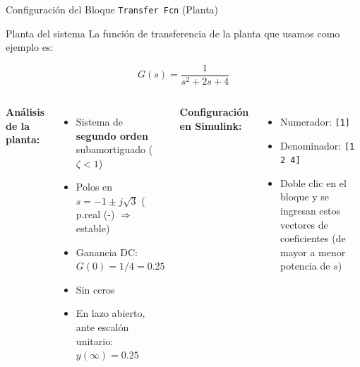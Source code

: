 \documentclass[aspectratio=169,xcolor=dvipsnames]{beamer}
\begin{document}
\begin{frame}{Configuración del Bloque \texttt{Transfer Fcn} (Planta)}
    \footnotesize
    \begin{block}{Planta del sistema}
        La función de transferencia de la planta que usamos como ejemplo es:
    \end{block}
    \begin{equation}
        G(s) = \frac{1}{s^2 + 2s + 4}
    \end{equation}
    \begin{columns}
        \textbf{Análisis de la planta:}
        \begin{itemize}
            \item Sistema de \textbf{segundo orden} subamortiguado ($\zeta < 1$)
            \item Polos en $s = -1 \pm j\sqrt{3}$ (  p.real (-) $\Rightarrow$ estable)
            \item Ganancia DC: $G(0) = 1/4 = 0.25$
            \item Sin ceros
            \item En lazo abierto, ante escalón unitario: $y(\infty) = 0.25$
        \end{itemize}
        \textbf{Configuración en Simulink:}
        \begin{itemize}
            \item Numerador: \texttt{[1]}
            \item Denominador: \texttt{[1 2 4]}
            \item Doble clic en el bloque y se ingresan estos vectores de coeficientes (de mayor a menor potencia de $s$)
        \end{itemize}
    \end{columns}
\end{frame}
\end{document}

